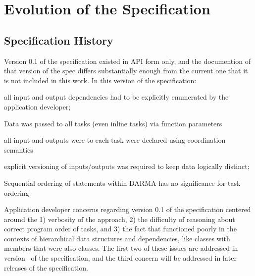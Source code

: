 
\chapter{Evolution of the Specification}
\label{chap:evolution}
\section{Specification History}
\label{sec:past}
Version 0.1 of the specification existed in \gls{API} form only, and
the documention of that version of the spec differs substantially
enough from the current one that it is not included in this work.
In this version of the specification:
\begin{compactenum}
\item all input and output dependencies had to be explicitly enumerated by the application
developer;
\item Data was passed to all tasks (even inline tasks) via function parameters
\item all input and outputs were to each task were declared using \gls{coordination semantics}
\item explicit versioning of inputs/outputs was required to keep data
logically distinct;
\item Sequential ordering of statements within DARMA has no significance for task ordering
\end{compactenum}

 Application developer concerns regarding version 0.1 of the specification
 centered around the 1) verbosity of the approach, 2) the difficulty of
 reasoning about correct program order of tasks, and 3) the fact that 
  functioned poorly in the contexts of hierarchical data
 structures and dependencies, like classes with members that were also
 classes.  The first two of these issues are addressed in version \specVersion\ of the
 specification, and the third concern will be addressed in later releases of the specification.
   


